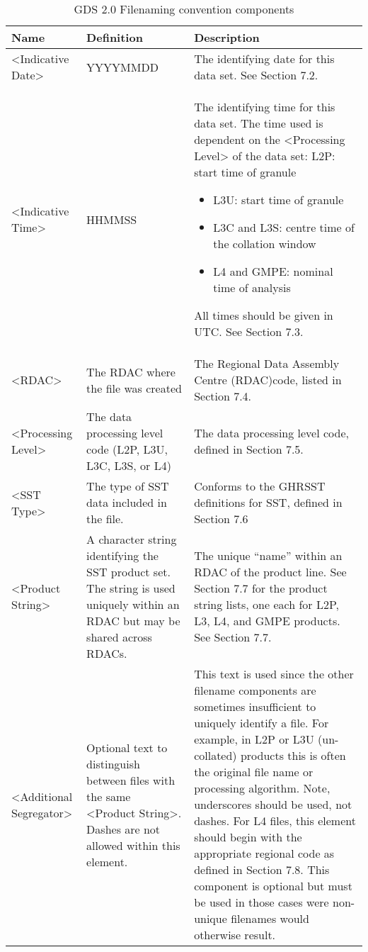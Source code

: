\begin{longtable}{|p{}|p{}|p{}|}
\caption{GDS 2.0 Filenaming convention components}
\label{tab:filenaming conventions}
\\ \hline
\rowcolor{lightgray}
\textbf{Name} & \textbf{Definition} & \textbf{Description} \\ \hline 
\endfirsthead
<Indicative Date> & YYYYMMDD & The identifying date for this data set. See Section 7.2. \\ \hline
<Indicative Time> & HHMMSS & The identifying time for this data set. The time used is dependent on the <Processing Level> of
the data set: L2P: start time of granule 
\begin{itemize}
 \item{L3U: start time of granule}
 \item{L3C and L3S: centre time of the collation window}
 \item{L4 and GMPE: nominal time of analysis}
\end{itemize}
All times should be given in UTC. See Section 7.3. \\ \hline
<RDAC> & The RDAC where the file was created & The Regional Data Assembly Centre (RDAC)code, listed in Section 7.4. \\ \hline
<Processing Level> & The data processing level code (L2P, L3U, L3C, L3S, or L4) & 
The data processing level code, defined in Section 7.5. \\ \hline
<SST Type> & The type of SST data included in the file. & 
Conforms to the GHRSST definitions for SST, defined in Section 7.6 \\ \hline

<Product String> &
A character string identifying the
SST product set. The string is
used uniquely within an RDAC
but may be shared across
RDACs. & 
The unique “name” within an RDAC of the
product line. See Section 7.7 for the product
string lists, one each for L2P, L3, L4, and GMPE
products. See Section 7.7. \\ \hline

<Additional Segregator> &
Optional text to distinguish
between files with the same
<Product String>. Dashes are
not allowed within this element. &
This text is used since the other filename
components are sometimes insufficient to
uniquely identify a file. For example, in L2P or
L3U (un-collated) products this is often the
original file name or processing algorithm. Note,
underscores should be used, not dashes. For L4
files, this element should begin with the
appropriate regional code as defined in Section 7.8. This component is optional but must be used
in those cases were non-unique filenames would otherwise result. \\ \hline


\end{longtable}
